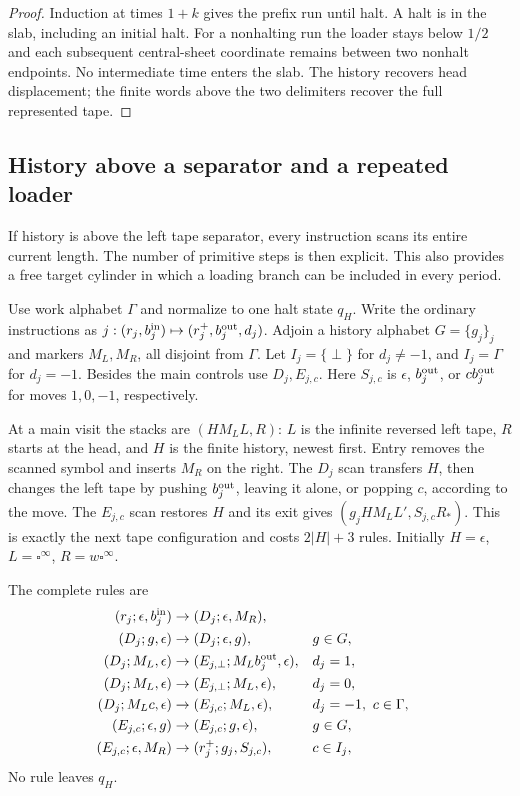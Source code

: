 \begin{proof}
Induction at times $1+k$ gives the prefix run until halt.  A halt is in
the slab, including an initial halt.  For a nonhalting run the loader
stays below $1/2$ and each subsequent central-sheet coordinate remains
between two nonhalt endpoints.  No intermediate time enters the slab.
The history recovers head displacement; the finite words above the two
delimiters recover the full represented tape.
\end{proof}

\subsection{History above a separator and a repeated loader}
\label{subsec:sa-repeated-loader}
If history is above the left tape separator, every instruction scans its
entire current length.  The number of primitive steps is then explicit.
This also provides a free target cylinder in which a loading branch can
be included in every period.

Use work alphabet $\Gamma$ and normalize to one halt state $q_H$.
Write the ordinary instructions as
$j:(r_j,b_j^{\rm in})\mapsto(r_j^+,b_j^{\rm out},d_j)$.
Adjoin a history alphabet $G=\{g_j\}_j$ and markers $M_L,M_R$,
all disjoint from $\Gamma$.
Let $I_j=\{\perp\}$ for $d_j\ne-1$, and $I_j=\Gamma$ for $d_j=-1$.
Besides the main controls use $D_j,E_{j,c}$.
Here $S_{j,c}$ is $\epsilon$, $b_j^{\rm out}$, or $cb_j^{\rm out}$
for moves $1,0,-1$, respectively.

At a main visit the stacks are $(HM_LL,R)$: $L$ is the infinite reversed
left tape, $R$ starts at the head, and $H$ is the finite history, newest
first.  Entry removes the scanned symbol and inserts $M_R$ on the right.
The $D_j$ scan transfers $H$, then changes the left tape by pushing
$b_j^{\rm out}$, leaving it alone, or popping $c$, according to the move.
The $E_{j,c}$ scan restores $H$ and its exit gives
$(g_jHM_LL',S_{j,c}R_*)$.  This is exactly the next tape configuration
and costs $2|H|+3$ rules.  Initially $H=\epsilon$,
$L=\square^\infty$, $R=w\square^\infty$.

The complete rules are
\[
\begin{aligned}
 (r_j;\epsilon,b_j^{\rm in})&\to(D_j;\epsilon,M_R),\\
 (D_j;g,\epsilon)&\to(D_j;\epsilon,g),&&g\in G,\\
 (D_j;M_L,\epsilon)&\to(E_{j,\perp};M_Lb_j^{\rm out},\epsilon),&&d_j=1,\\
 (D_j;M_L,\epsilon)&\to(E_{j,\perp};M_L,\epsilon),&&d_j=0,\\
 (D_j;M_Lc,\epsilon)&\to(E_{j,c};M_L,\epsilon),&&d_j=-1,\ c\in\Gamma,\\
 (E_{j,c};\epsilon,g)&\to(E_{j,c};g,\epsilon),&&g\in G,\\
 (E_{j,c};\epsilon,M_R)&\to(r_j^+;g_j,S_{j,c}),&&c\in I_j,
\end{aligned}
\]
No rule leaves $q_H$.

